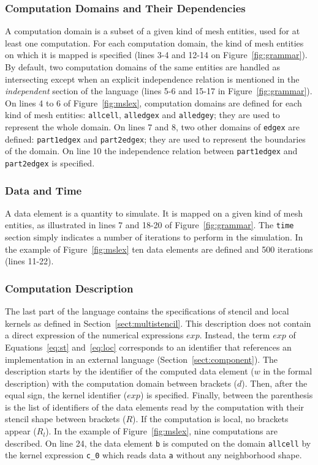 \subsubsection*{Computation Domains and Their Dependencies}
A computation domain is a subset of a given kind of mesh entities, used for at least one computation.
For each computation domain, the kind of mesh entities on which it is mapped is specified (lines 3-4 and 12-14 on Figure~\ref{fig:grammar}).
By default, two computation domains of the same entities are handled as intersecting except when an explicit independence relation is mentioned in the \emph{independent} section of the language (lines 5-6 and 15-17 in Figure~\ref{fig:grammar}).
On lines 4 to 6 of Figure~\ref{fig:mslex}, computation domains are defined for each kind of mesh entities: \texttt{allcell}, \texttt{alledgex} and \texttt{alledgey}; they are used to represent the whole domain.
On lines 7 and 8, two other domains of \texttt{edgex} are defined: \texttt{part1edgex} and \texttt{part2edgex}; they are used to represent the boundaries of the domain.
On line 10 the independence relation between \texttt{part1edgex} and \texttt{part2edgex} is specified.

\subsubsection*{Data and Time}
A data element is a quantity to simulate. It is mapped on a given kind of mesh entities, as illustrated in lines 7 and 18-20 of Figure~\ref{fig:grammar}. The \texttt{time} section simply indicates a number of iterations to perform in the simulation. In the example of Figure~\ref{fig:mslex} ten data elements are defined and 500 iterations (lines 11-22). %


\subsubsection*{Computation Description}
The last part of the language contains the specifications of stencil and local kernels as defined in Section~\ref{sect:multistencil}.
This description does not contain a direct expression of the numerical expressions $exp$.
Instead, the term $exp$ of Equations~\ref{eq:st} and~\ref{eq:loc} corresponds to an identifier that references an implementation in an external language  (\cf Section~\ref{sect:component}).
The description starts by the identifier of the computed data element ($w$ in the formal description) with the computation domain between brackets ($d$).
Then, after the equal sign, the kernel identifier ($exp$) is specified.
Finally, between the parenthesis is the list of identifiers of the data elements read by the computation with their stencil shape between brackets ($R$).
If the computation is local, no brackets appear ($R_l$). In the example of Figure~\ref{fig:mslex}, nine computations are described. On line 24, the data element \texttt{b} is computed on the domain \texttt{allcell} by the kernel expression \texttt{c\_0} which reads data \texttt{a} without any neighborhood shape.

